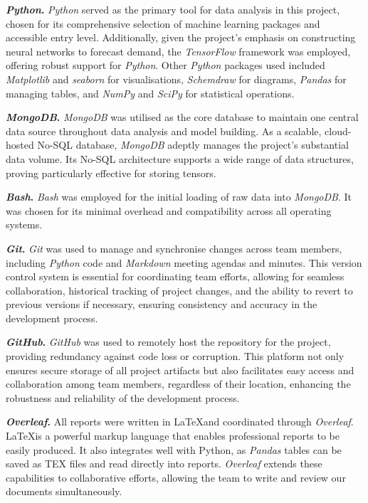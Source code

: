 \documentclass[mstat,12pt]{unswthesis}
\begin{document}
\textbf{\textit{Python}.} \textit{Python} served as the primary tool for data analysis in this project, chosen for its comprehensive selection of machine learning packages and accessible entry level. Additionally, given the project's emphasis on constructing neural networks to forecast demand, the \textit{TensorFlow} framework was employed, offering robust support for \textit{Python}. Other \textit{Python} packages used included \textit{Matplotlib} and \textit{seaborn} for visualisations, \textit{Schemdraw} for diagrams, \textit{Pandas} for managing tables, and \textit{NumPy} and \textit{SciPy} for statistical operations.

\textbf{\textit{MongoDB}.} \textit{MongoDB} was utilised as the core database to maintain one central data source throughout data analysis and model building. As a scalable, cloud-hosted No-SQL database, \textit{MongoDB} adeptly manages the project's substantial data volume. Its No-SQL architecture supports a wide range of data structures, proving particularly effective for storing tensors.

\textbf{\textit{Bash}.} \textit{Bash} was employed for the initial loading of raw data into \textit{MongoDB}. It was chosen for its minimal overhead and compatibility across all operating systems.

\textbf{\textit{Git}.} \textit{Git} was used to manage and synchronise changes across team members, including \textit{Python} code and \textit{Markdown} meeting agendas and minutes. This version control system is essential for coordinating team efforts, allowing for seamless collaboration, historical tracking of project changes, and the ability to revert to previous versions if necessary, ensuring consistency and accuracy in the development process.

\textbf{\textit{GitHub}.} \textit{GitHub} was used to remotely host the repository for the project, providing redundancy against code loss or corruption. This platform not only ensures secure storage of all project artifacts but also facilitates easy access and collaboration among team members, regardless of their location, enhancing the robustness and reliability of the development process.

\textbf{\textit{Overleaf}.} All reports were written in \LaTeX and coordinated through \textit{Overleaf}. \LaTeX is a powerful markup language that enables professional reports to be easily produced. It also integrates well with Python, as \textit{Pandas} tables can be saved as TEX files and read directly into reports. \textit{Overleaf} extends these capabilities to collaborative efforts, allowing the team to write and review our documents simultaneously.
\end{document}
